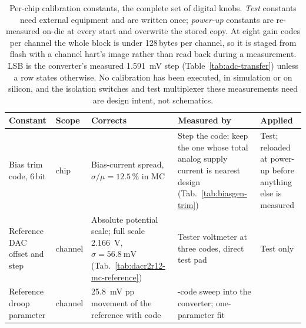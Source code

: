 \begin{table}[htbp]
  \centering
  \caption[{Per-chip calibration constants.}]{Per-chip calibration constants,
  the complete set of digital knobs. \emph{Test} constants need external
  equipment and are written once; \emph{power-up} constants are re-measured
  on-die at every start and overwrite the stored copy. At eight gain codes per
  channel the whole block is under 128\,bytes per channel, so it is staged from
  flash with a channel hart's image rather than read back during a measurement.
  LSB is the converter's measured \SI{1.591}{\milli\volt} step
  (Table~\ref{tab:adc-transfer}) unless a row states otherwise. No calibration has been executed, in
  simulation or on silicon, and the isolation switches and test multiplexer
  these measurements need are design intent, not schematics.}
  \label{tab:calibration-constants}
  {\footnotesize
  \setlength{\tabcolsep}{4pt}
  \begin{tabular}{@{}%
    >{\raggedright\arraybackslash}p{}%
    >{\raggedright\arraybackslash}p{}%
    >{\raggedright\arraybackslash}p{}%
    >{\raggedright\arraybackslash}p{}%
    >{\raggedright\arraybackslash}p{}@{}}
    \toprule
    Constant & Scope & Corrects & Measured by & Applied \\
    \midrule
    Bias trim code, 6\,bit &
    chip &
    Bias-current spread, \(\sigma/\mu = 12.5\,\%\) in MC &
    Step the code; keep the one whose total analog supply current is nearest
    design (Tab.~\ref{tab:biasgen-trim}) &
    Test; reloaded at power-up before anything else is measured \\
    \addlinespace
    Reference DAC offset and step &
    channel &
    Absolute potential scale; full scale \SI{2.166}{\volt}, \(\sigma =
    \SI{56.8}{\milli\volt}\) (Tab.~\ref{tab:dacr2r12-mc-reference}) &
    Tester voltmeter at three codes, direct test pad &
    Test only \\
    \addlinespace
    Reference droop parameter &
    channel &
    \SI{25.8}{\milli\volt} pp movement of the reference with code &
    4096-code sweep into the converter; one-parameter fit

\end{tabular}}
\end{table}
